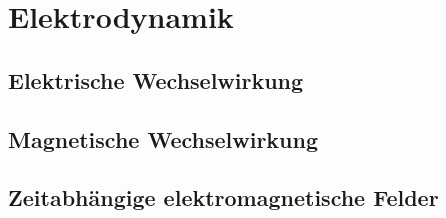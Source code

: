 \section{Elektrodynamik}%
\label{edyn:sec:elektrodynamik}

\subsection{Elektrische Wechselwirkung}%
\label{edyn:sub:elektrische_wechselwirkung}

\subsection{Magnetische Wechselwirkung}%
\label{edyn:sub:magnetische_wechselwirkung}

\subsection{Zeitabhängige elektromagnetische Felder}%
\label{edyn:sub:zeitabhaengige_elektromagnetische_felder}

